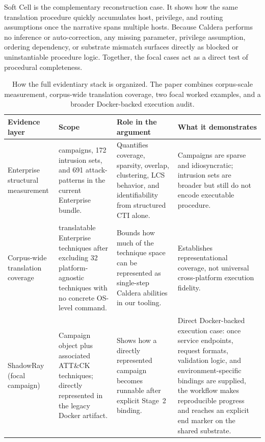 \documentclass[sigconf]{acmart}
\newcommand{\attack}{ATT\&CK\xspace}
\newcommand{\caldera}{Caldera\xspace}
\begin{document}
Soft Cell is the complementary reconstruction case. It shows how the same translation procedure quickly accumulates host, privilege, and routing assumptions once the narrative spans multiple hosts. Because \caldera{} performs no inference or auto-correction, any missing parameter, privilege assumption, ordering dependency, or substrate mismatch surfaces directly as blocked or uninstantiable procedure logic. Together, the focal cases act as a direct test of procedural completeness.

\begin{table}[htpb]
\caption{How the full evidentiary stack is organized. The paper combines corpus-scale measurement, corpus-wide translation coverage, two focal worked examples, and a broader Docker-backed execution audit.}
\label{tab:case_evidence}
\centering
\small
\renewcommand{\arraystretch}{1.15}
\begin{tabular}{@{}%
  >{\raggedright\arraybackslash}m{}
  >{\raggedright\arraybackslash}m{}
  >{\raggedright\arraybackslash}m{}
  >{\raggedright\arraybackslash}m{}@{}}
\toprule
\textbf{Evidence layer}
& \textbf{Scope}
& \textbf{Role in the argument}
& \textbf{What it demonstrates} \\
\midrule

Enterprise structural measurement
& 51 campaigns, 172 intrusion sets, and 691 attack-patterns in the current Enterprise bundle.
& Quantifies coverage, sparsity, overlap, clustering, LCS behavior, and identifiability from structured CTI alone.
& Campaigns are sparse and idiosyncratic; intrusion sets are broader but still do not encode executable procedure. \\

Corpus-wide translation coverage
& 659 translatable Enterprise techniques after excluding 32 platform-agnostic techniques with no concrete OS-level command.
& Bounds how much of the technique space can be represented as single-step \caldera{} abilities in our tooling.
& Establishes representational coverage, not universal cross-platform execution fidelity. \\

ShadowRay (focal campaign)
& Campaign object plus associated \attack{} techniques; directly represented in the legacy Docker artifact.
& Shows how a directly represented campaign becomes runnable after explicit Stage~2 binding.
& Direct Docker-backed execution case: once service endpoints, request formats, validation logic, and environment-specific bindings are supplied, the workflow makes reproducible progress and reaches an explicit end marker on the shared substrate. \\


\end{tabular}
\end{table}
\end{document}
